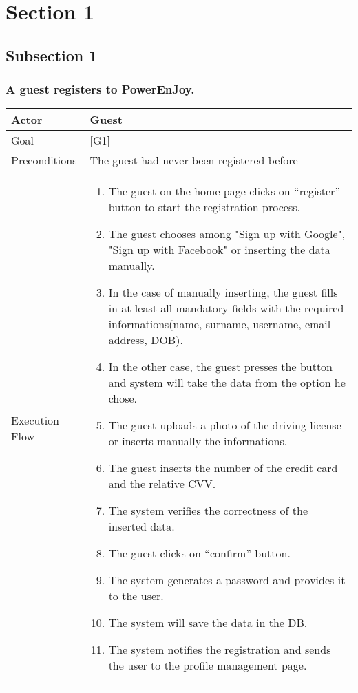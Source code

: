 \documentclass{article}
\begin{document}
	\section{Section 1}
	\subsection{Subsection 1}

	\subsubsection{A guest registers to PowerEnJoy.}
	\begin{tabularx}{\textwidth}{  l  X  }
		\hline
		Actor & Guest\\
		\hline
		Goal & [G1]\\
		\hline
		Preconditions & The guest had never been registered before\\
		\hline
		Execution Flow & \begin{enumerate}
                     \item{The guest on the home page clicks on “register” button to start the registration process.}
                     \item{The guest chooses among "Sign up with Google", "Sign up with Facebook" or inserting the data manually.}
						 				 \item{In the case of manually inserting, the guest fills in at least all mandatory fields with the required informations(name, surname, username, email address, DOB).}
                     \item{In the other case, the guest presses the button and system will take the data from the option he chose.}
                     \item{The guest uploads a photo of the driving license or inserts manually the informations.}
										 \item{The guest inserts the number of the credit card and the relative CVV}.
						  		 	 \item{The system verifies the correctness of the inserted data.}
						 			 	 \item{The guest clicks on “confirm” button.}
						 			 	 \item{The system generates a password and provides it to the user.}
						 			 	 \item{The system will save the data in the DB.}
						 			 	 \item{The system notifies the registration and sends the user to the profile management page.}

\end{enumerate}
\end{tabularx}
\end{document}
